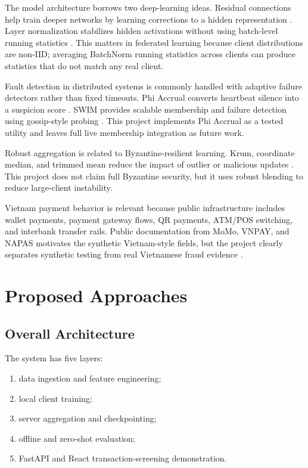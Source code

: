 \documentclass[conference]{IEEEtran}
\begin{document}
The model architecture borrows two deep-learning ideas. Residual connections
help train deeper networks by learning corrections to a hidden representation
\cite{resnet}. Layer normalization stabilizes hidden activations without using
batch-level running statistics \cite{layernorm}. This matters in federated
learning because client distributions are non-IID; averaging BatchNorm running
statistics across clients can produce statistics that do not match any real
client.

Fault detection in distributed systems is commonly handled with adaptive
failure detectors rather than fixed timeouts. Phi Accrual converts heartbeat
silence into a suspicion score \cite{phi}. SWIM provides scalable membership
and failure detection using gossip-style probing \cite{swim}. This project
implements Phi Accrual as a tested utility and leaves full live membership
integration as future work.

Robust aggregation is related to Byzantine-resilient learning. Krum,
coordinate median, and trimmed mean reduce the impact of outlier or malicious
updates \cite{krum, byzantine}. This project does not claim full Byzantine
security, but it uses robust blending to reduce large-client instability.

Vietnam payment behavior is relevant because public infrastructure includes
wallet payments, payment gateway flows, QR payments, ATM/POS switching, and
interbank transfer rails. Public documentation from MoMo, VNPAY, and NAPAS
motivates the synthetic Vietnam-style fields, but the project clearly separates
synthetic testing from real Vietnamese fraud evidence \cite{momo, vnpay,
napas}.

\section{Proposed Approaches}

\subsection{Overall Architecture}

The system has five layers:

\begin{enumerate}
  \item data ingestion and feature engineering;
  \item local client training;
  \item server aggregation and checkpointing;
  \item offline and zero-shot evaluation;
  \item FastAPI and React transaction-screening demonstration.
\end{enumerate}
\end{document}
